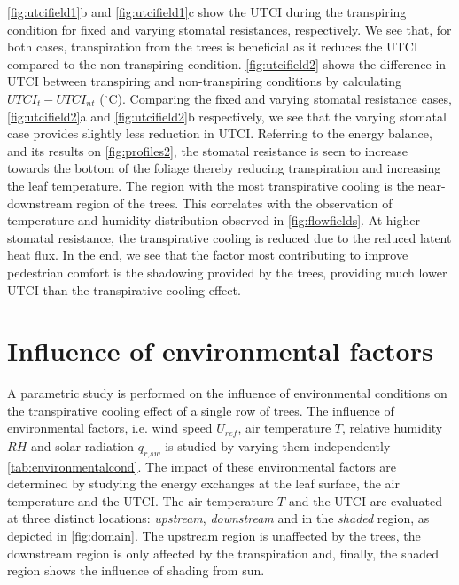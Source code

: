 \cref{fig:utcifield1}b and \cref{fig:utcifield1}c show the UTCI during the transpiring condition for fixed and varying stomatal resistances, respectively. We see that, for both cases, transpiration from the trees is beneficial as it reduces the UTCI compared to the non-transpiring condition. \cref{fig:utcifield2} shows the difference in UTCI between transpiring and non-transpiring conditions by calculating $\textit{UTCI}_t-\textit{UTCI}_{\textit{nt}}$ ($^{\circ}$C). Comparing the fixed and varying stomatal resistance cases, \cref{fig:utcifield2}a and \cref{fig:utcifield2}b respectively, we see that the varying stomatal case provides slightly less reduction in UTCI. Referring to the energy balance, and its results on \cref{fig:profiles2}, the stomatal resistance is seen to increase towards the bottom of the foliage thereby reducing transpiration and increasing the leaf temperature. The region with the most transpirative cooling is the near-downstream region of the trees. This correlates with the observation of temperature and humidity distribution observed in \cref{fig:flowfields}. At higher stomatal resistance, the transpirative cooling is reduced due to the reduced latent heat flux. In the end, we see that the factor most contributing to improve pedestrian comfort is the shadowing provided by the trees, providing much lower UTCI than the transpirative cooling effect. 

\section{Influence of environmental factors}

A parametric study is performed on the influence of environmental conditions on the transpirative cooling effect of a single row of trees. The influence of environmental factors, i.e. wind speed $U_{\textit{ref}}$, air temperature $T$, relative humidity $\textit{RH}$ and solar radiation $q_{\textit{r,sw}}$ is studied by varying them independently \cref{tab:environmentalcond}. The impact of these environmental factors are determined by studying the energy exchanges at the leaf surface, the air temperature and the UTCI. The air temperature $T$ and the UTCI are evaluated at three distinct locations: \textit{upstream}, \textit{downstream} and in the \textit{shaded} region, as depicted in \cref{fig:domain}. The upstream region is unaffected by the trees, the downstream region is only affected by the transpiration and, finally, the shaded region shows the influence of shading from sun. 


